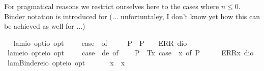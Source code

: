 \begin{isabellebody}
\begin{isamarkuptext}
  For pragmatical reasons we restrict ourselves here to the cases where $n\leq 0$. Binder notation is
  introduced for \isa{\isactrlbold {\isasymlambda}} (... unfortuntaley, I don't know yet how this can be achieved as well 
  for  ...)%
\end{isamarkuptext}%
\isamarkuptrue%
\ \isamarkupfalse%
\ lam{}{\isacharcolon}{\isacharcolon}{\isachardoublequoteopen}io\ opt{\isasymRightarrow}io\ opt{\isachardoublequoteclose}\ {\isacharparenleft}{\isachardoublequoteopen}\isactrlbold {\isasymlambda}\ \ {\isachardoublequoteopen}\isactrlbold {\isasymlambda}\ {\isasymequiv}\ case\ {\isasymphi}\ of\ \isanewline
\ \ \ \ P{\isacharparenleft}{\isasympsi}{\isacharparenright}\ {\isasymRightarrow}\ P{\isacharparenleft}{\isasympsi}{\isacharparenright}\ {\isacharbar}\ {\isacharunderscore}\ {\isasymRightarrow}\ ERR\ dio{\isachardoublequoteclose}\ \ \isanewline
\isanewline
\ \isamarkupfalse%
\ lam{\isacharcolon}{\isacharcolon}{\isachardoublequoteopen}{\isacharparenleft}e{\isasymRightarrow}io\ opt{\isacharparenright}{\isasymRightarrow}{\isacharparenleft}e{\isasymRightarrow}io{\isacharparenright}\ opt{\isachardoublequoteclose}\ {\isacharparenleft}{\isachardoublequoteopen}\isactrlbold {\isasymlambda}{\isachardoublequoteclose}{\isacharparenright}\ \ {\isachardoublequoteopen}\isactrlbold {\isasymlambda}{\isasymPhi}\ {\isasymequiv}\ case\ {\isacharparenleft}{\isasymPhi}\ de{\isacharparenright}\ of\isanewline
\ \ \ \ P{\isacharparenleft}{\isasymphi}{\isacharparenright}\ {\isasymRightarrow}\ T{\isacharparenleft}{\isasymlambda}x{\isachardot}\ case\ {\isacharparenleft}{\isasymPhi}\ x{\isacharparenright}\ of\ P{\isacharparenleft}{\isasymphi}{\isacharparenright}\ {\isasymRightarrow}\ {\isasymphi}{\isacharparenright}\ {\isacharbar}\ {\isacharunderscore}\ {\isasymRightarrow}\ ERR{\isacharparenleft}{\isasymlambda}x{\isachardot}\ dio{\isacharparenright}{\isachardoublequoteclose}\isanewline
\ \isamarkupfalse%
\ lamBinder{\isacharcolon}{\isacharcolon}{\isachardoublequoteopen}{\isacharparenleft}e{\isasymRightarrow}io\ opt{\isacharparenright}{\isasymRightarrow}{\isacharparenleft}e{\isasymRightarrow}io{\isacharparenright}\ opt{\isachardoublequoteclose}\ {\isacharparenleft}\ {\isachardoublequoteopen}\isactrlbold {\isasymlambda}{\isachardoublequoteclose}\ {\isacharbrackleft}{}{\isacharbrackright}\ {}{\isacharparenright}\ \ \ {\isachardoublequoteopen}\isactrlbold {\isasymlambda}x{\isachardot}\ {\isasymphi}\ x\ {\isasymequiv}\ \isactrlbold {\isasymlambda}\ {\isasymphi}{\isachardoublequoteclose}\isanewline

\end{isabellebody}
